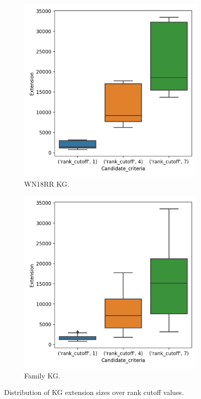 \begin{figure}[htb]
\centering
\begin{subfigure}{.5\textwidth}
  \centering
  \includegraphics[width=1\linewidth]{figures/results/ranks/Extension_size_entity_wn18rr.png}
  \caption{WN18RR KG.}
  \label{fig:rank_extension_wn18rr_boxplot_sub}
\end{subfigure}%
\begin{subfigure}{.5\textwidth}
  \centering
  \includegraphics[width=1\linewidth]{figures/results/ranks/Extension_size_entity_family.png}
  \caption{Family KG.}
  \label{fig:rank_extension_family_boxplot_sub}
\end{subfigure}
\caption{Distribution of KG extension sizes over rank cutoff values.}
\label{rank_extensions_boxplot}
\end{figure}

